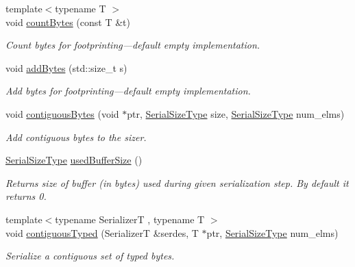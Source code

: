 \begin{DoxyCompactItemize}
{\footnotesize template$<$typename T $>$ }\\void \hyperlink{structcheckpoint_1_1_base_serializer_ae5f1634cea01bf4e28008320fed7be1d}{count\+Bytes} (const T \&t)
\begin{DoxyCompactList}\small\item\em Count bytes for footprinting---default empty implementation. \end{DoxyCompactList}\item 
void \hyperlink{structcheckpoint_1_1_base_serializer_ac1d15d1c529fe82280fd9547b3843541}{add\+Bytes} (std\+::size\+\_\+t s)
\begin{DoxyCompactList}\small\item\em Add bytes for footprinting---default empty implementation. \end{DoxyCompactList}\item 
void \hyperlink{structcheckpoint_1_1_base_serializer_acb789d8d69ba8b2f43b38af163eee9da}{contiguous\+Bytes} (void $\ast$ptr, \hyperlink{namespacecheckpoint_a083f6674da3f94c2901b18c6d238217c}{Serial\+Size\+Type} size, \hyperlink{namespacecheckpoint_a083f6674da3f94c2901b18c6d238217c}{Serial\+Size\+Type} num\+\_\+elms)
\begin{DoxyCompactList}\small\item\em Add contiguous bytes to the sizer. \end{DoxyCompactList}\item 
\hyperlink{namespacecheckpoint_a083f6674da3f94c2901b18c6d238217c}{Serial\+Size\+Type} \hyperlink{structcheckpoint_1_1_base_serializer_a6ccb8bb1430ac5665aac995b6330bc8a}{used\+Buffer\+Size} ()
\begin{DoxyCompactList}\small\item\em Returns size of buffer (in bytes) used during given serialization step. By default it returns 0. \end{DoxyCompactList}\item 
{\footnotesize template$<$typename SerializerT , typename T $>$ }\\void \hyperlink{structcheckpoint_1_1_base_serializer_a7a18f4ba50fcfd8b37c8a6efc459ccde}{contiguous\+Typed} (SerializerT \&serdes, T $\ast$ptr, \hyperlink{namespacecheckpoint_a083f6674da3f94c2901b18c6d238217c}{Serial\+Size\+Type} num\+\_\+elms)
\begin{DoxyCompactList}\small\item\em Serialize a contiguous set of typed bytes. \end{DoxyCompactList}\item 

\end{DoxyCompactItemize}
